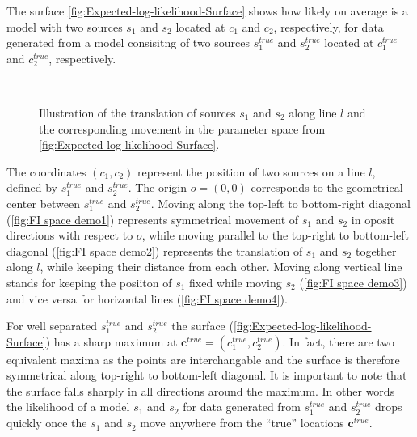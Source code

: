 The surface \autoref{fig:Expected-log-likelihood-Surface} shows how likely on average is a model with two sources $s_1$ and $s_2$ located at $c_1$ and $c_2$, respectively, for data generated from a model consisitng of two sources $s_1^{true}$ and $s_2^{true}$ located at $c_1^{true}$ and $c_2^{true}$, respectively. 

\begin{figure}[bt]
	\newcommand{\wf}{.48\textwidth}
	\centering
	 \\
	\caption{Illustration of the translation of sources $s_1$ and $s_2$ along line $l$ and the corresponding movement in the parameter space from \autoref{fig:Expected-log-likelihood-Surface}.}
	\label{fig:FI space demo}
\end{figure}
%
The coordinates $(c_1,c_2)$ represent the position of two sources on a line $l$, defined by $s_1^{true}$ and  $s_2^{true}$. The origin $o=(0,0)$ corresponds to the geometrical center between $s_1^{true}$ and $s_2^{true}$. Moving along the top-left to bottom-right diagonal (\autoref{fig:FI space demo1}) represents symmetrical movement of $s_1$ and $s_2$  in oposit directions with respect to $o$, while moving parallel to the top-right to bottom-left diagonal (\autoref{fig:FI space demo2}) represents the translation of $s_1$ and $s_2$ together along $l$, while keeping their distance from each other. Moving along vertical line stands for keeping the posiiton of $s_1$ fixed while moving $s_2$ (\autoref{fig:FI space demo3}) and vice versa for horizontal lines (\autoref{fig:FI space demo4}).

For well separated $s_1^{true}$ and $s_2^{true}$ the surface (\autoref{fig:Expected-log-likelihood-Surface}\aaa) has a sharp maximum at $\bm{c}^{true}=(c_1^{true},c_2^{true})$. In fact, there are two equivalent maxima as the points are interchangable and the surface is therefore symmetrical along top-right to bottom-left diagonal. It is important to note that the surface falls sharply in all directions around the maximum. In other words the likelihood of a model $s_1$ and $s_2$ for data generated from $s_1^{true}$ and $s_2^{true}$ drops quickly once the $s_1$ and $s_2$ move anywhere from the ``true'' locations $\bm{c}^{true}$.

